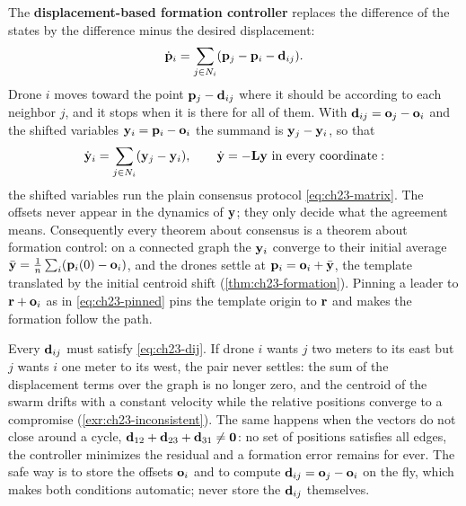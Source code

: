 The \textbf{displacement-based formation controller}
\cite{oh2015survey,ren2008distributed} replaces the difference of the states
by the difference minus the desired displacement:
\begin{equation}
  \dot{\mathbf{p}}_i = \sum_{j \in N_i} (\mathbf{p}_j - \mathbf{p}_i - \mathbf{d}_{ij}).
  \label{eq:ch23-formation}
\end{equation}
Drone $i$ moves toward the point $\mathbf{p}_j - \mathbf{d}_{ij}$ where it should be
according to each neighbor $j$, and it stops when it is there for all of them.
With $\mathbf{d}_{ij} = \mathbf{o}_j - \mathbf{o}_i$ and the shifted variables
$\mathbf{y}_i = \mathbf{p}_i - \mathbf{o}_i$ the summand is $\mathbf{y}_j - \mathbf{y}_i$,
so that
\begin{equation}
  \dot{\mathbf{y}}_i = \sum_{j \in N_i} (\mathbf{y}_j - \mathbf{y}_i),
  \qquad \dot{\mathbf{y}} = -\mathbf{L}\mathbf{y} \text{ in every coordinate}:
  \label{eq:ch23-shift}
\end{equation}
the shifted variables run the plain consensus protocol
\cref{eq:ch23-matrix}. The offsets never appear in the dynamics of
$\mathbf{y}$; they only decide what the agreement means. Consequently every
theorem about consensus is a theorem about formation control: on a connected
graph the $\mathbf{y}_i$ converge to their initial average
$\bar{\mathbf{y}} = \frac{1}{n}\sum_i (\mathbf{p}_i(0) - \mathbf{o}_i)$, and the drones
settle at $\mathbf{p}_i = \mathbf{o}_i + \bar{\mathbf{y}}$, the template translated by the
initial centroid shift (\cref{thm:ch23-formation}). Pinning a leader to
$\mathbf{r} + \mathbf{o}_i$ as in \cref{eq:ch23-pinned} pins the template origin to
$\mathbf{r}$ and makes the formation follow the path.

\begin{pitfall}
Every $\mathbf{d}_{ij}$ must satisfy \cref{eq:ch23-dij}. If drone $i$ wants $j$
two meters to its east but $j$ wants $i$ one meter to its west, the pair
never settles: the sum of the displacement terms over the graph is no longer
zero, and the centroid of the swarm drifts with a constant velocity while the
relative positions converge to a compromise (\cref{exr:ch23-inconsistent}).
The same happens when the vectors do not close around a cycle,
$\mathbf{d}_{12} + \mathbf{d}_{23} + \mathbf{d}_{31} \ne \mathbf{0}$: no set of
positions satisfies all edges, the controller minimizes the residual and a
formation error remains for ever. The safe way is to store the offsets
$\mathbf{o}_i$ and to compute $\mathbf{d}_{ij} = \mathbf{o}_j - \mathbf{o}_i$ on the
fly, which makes both conditions automatic; never store the $\mathbf{d}_{ij}$
themselves.
\end{pitfall}

